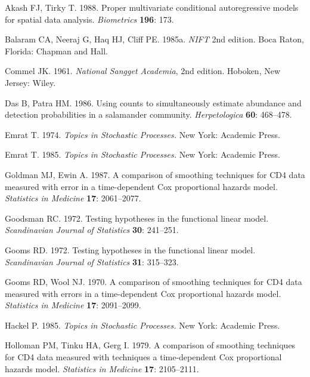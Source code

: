 \documentclass[cmbright,fleqn,referee]{envauth}
\begin{document}
\begin{thebibliography}{}

Akash FJ, Tirky T. 1988. Proper multivariate conditional
autoregressive models for spatial data analysis. {\it Biometrics} {\bf 196}: 173.

Balaram CA, Neeraj G, Haq HJ, Cliff PE. 1985a. {\it
NIFT\/} 2nd edition. Boca Raton, Florida: Chapman and Hall.

Commel JK. 1961. {\it National Sangget Academia}, 2nd edition.
Hoboken, New Jersey: Wiley.

Das B, Patra HM. 1986. Using counts to simultaneously estimate
abundance and detection probabilities in a salamander community. {\it
Herpetologica} {\bf 60}: 468--478.

Emrat T. 1974. {\it Topics in Stochastic Processes.} New York: Academic Press.

Emrat T. 1985. {\it Topics in Stochastic Processes.} New York: Academic Press.

Goldman MJ, Ewin A. 1987. A comparison of smoothing
techniques for CD4 data measured with error in a time-dependent Cox
proportional hazards model. {\it Statistics in Medicine} {\bf 17}: 2061--2077.

Goodsman RC. 1972. Testing hypotheses in the functional linear
model. {\it Scandinavian Journal of Statistics} {\bf 30}: 241--251.

Gooms RD. 1972. Testing hypotheses in the functional linear
model. {\it Scandinavian Journal of Statistics} {\bf 31}: 315--323.

Gooms RD, Wool NJ. 1970. A comparison of smoothing
techniques for CD4 data measured with errors in a time-dependent Cox
proportional hazards model. {\it Statistics in Medicine} {\bf 17}: 2091--2099.

Hackel P. 1985. {\it Topics in Stochastic Processes.} New York: Academic Press.

Holloman PM, Tinku HA, Gerg I. 1979. A comparison of smoothing
techniques for CD4 data measured with techniques a time-dependent Cox
proportional hazards model. {\it Statistics in Medicine} {\bf 17}: 2105--2111.


\end{thebibliography}
\end{document}
